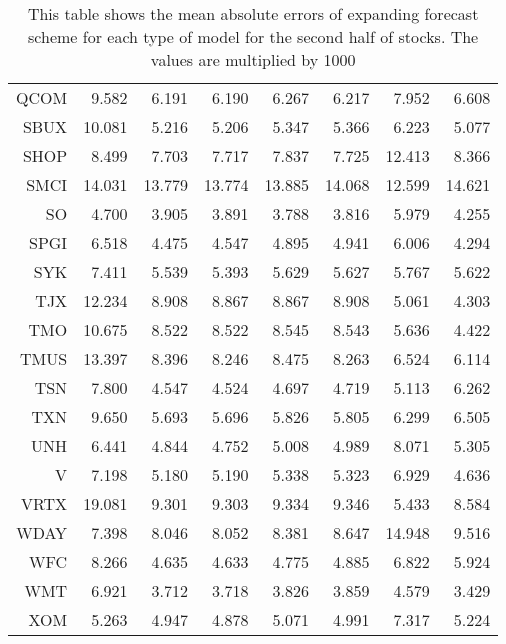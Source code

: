 \begin{table}[ht]
\begin{tabular}{rrrrrrrr}
  QCOM & 9.582 & 6.191 & 6.190 & 6.267 & 6.217 & 7.952 & 6.608 \\ 
  SBUX & 10.081 & 5.216 & 5.206 & 5.347 & 5.366 & 6.223 & 5.077 \\ 
  SHOP & 8.499 & 7.703 & 7.717 & 7.837 & 7.725 & 12.413 & 8.366 \\ 
  SMCI & 14.031 & 13.779 & 13.774 & 13.885 & 14.068 & 12.599 & 14.621 \\ 
  SO & 4.700 & 3.905 & 3.891 & 3.788 & 3.816 & 5.979 & 4.255 \\ 
  SPGI & 6.518 & 4.475 & 4.547 & 4.895 & 4.941 & 6.006 & 4.294 \\ 
  SYK & 7.411 & 5.539 & 5.393 & 5.629 & 5.627 & 5.767 & 5.622 \\ 
  TJX & 12.234 & 8.908 & 8.867 & 8.867 & 8.908 & 5.061 & 4.303 \\ 
  TMO & 10.675 & 8.522 & 8.522 & 8.545 & 8.543 & 5.636 & 4.422 \\ 
  TMUS & 13.397 & 8.396 & 8.246 & 8.475 & 8.263 & 6.524 & 6.114 \\ 
  TSN & 7.800 & 4.547 & 4.524 & 4.697 & 4.719 & 5.113 & 6.262 \\ 
  TXN & 9.650 & 5.693 & 5.696 & 5.826 & 5.805 & 6.299 & 6.505 \\ 
  UNH & 6.441 & 4.844 & 4.752 & 5.008 & 4.989 & 8.071 & 5.305 \\ 
  V & 7.198 & 5.180 & 5.190 & 5.338 & 5.323 & 6.929 & 4.636 \\ 
  VRTX & 19.081 & 9.301 & 9.303 & 9.334 & 9.346 & 5.433 & 8.584 \\ 
  WDAY & 7.398 & 8.046 & 8.052 & 8.381 & 8.647 & 14.948 & 9.516 \\ 
  WFC & 8.266 & 4.635 & 4.633 & 4.775 & 4.885 & 6.822 & 5.924 \\ 
  WMT & 6.921 & 3.712 & 3.718 & 3.826 & 3.859 & 4.579 & 3.429 \\ 
  XOM & 5.263 & 4.947 & 4.878 & 5.071 & 4.991 & 7.317 & 5.224 \\ 
   \hline
\end{tabular}
\caption[MAE expanding forecast (2)]{This table shows the mean absolute errors of expanding forecast scheme for each type of model for the second half of stocks. 
                     The values are multiplied by 1000} 
\label{Table:MAE_e_2}
\end{table}
